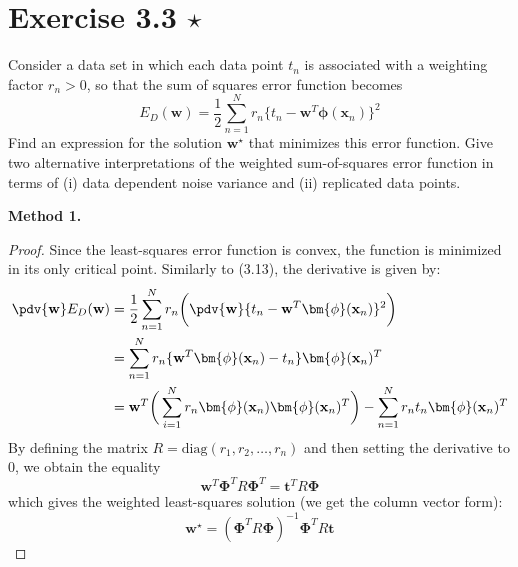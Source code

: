 \section*{Exercise 3.3 $\star$}
Consider a data set in which each data point $t_n$ is associated with a weighting
factor $r_n > 0$, so that the sum of squares error function becomes
\begin{equation}\label{eq:3.104}\tag{3.104}
    E_D(\mathbf{w}) = \frac{1}{2} \sum_{n=1}^{N} 
    r_n\{t_n - \mathbf{w}^T \bm{\phi}(\mathbf{x}_n)\}^2
\end{equation}
Find an expression for the solution $\mathbf{w}^\star$ that minimizes this error function.
Give two alternative interpretations of the weighted sum-of-squares error function
in terms of (i) data dependent noise variance and (ii) replicated data points.

\vspace{1em}

\textbf{Method 1.}

\begin{proof}
    Since the least-squares error function is convex,
    the function is minimized in its only critical 
    point. Similarly to (3.13), the derivative is given by:
    \begin{align*}
        \pdv{\mathbf{w}} E_D(\mathbf{w})
        &= \frac{1}{2} \sum_{n=1}^{N} r_n \bigg(\pdv{\mathbf{w}} 
        \{t_n - \mathbf{w}^T \bm{\phi}(\mathbf{x}_n)\}^2\bigg) \\
        &= \sum_{n=1}^N r_n \{\mathbf{w}^T \bm{\phi}(\mathbf{x}_n) - t_n\} 
        \bm{\phi}(\mathbf{x}_n)^T \\
        &= \mathbf{w}^T 
        \bigg(\sum_{i=1}^{N} r_n \bm{\phi}(\mathbf{x}_n)
        \bm{\phi}(\mathbf{x}_n)^T\bigg) -
        \sum_{n=1}^{N} r_n t_n \bm{\phi}(\mathbf{x}_n)^T
    \end{align*}
    By defining the matrix $R = \text{diag}(r_1, r_2, \ldots, r_n)$
    and then setting the derivative to 0, we obtain the equality
    \[
        \mathbf{w}^T \mathbf{\Phi}^TR\mathbf{\Phi}^T
        = \mathbf{t}^TR\mathbf{\Phi} 
    \] 
    which gives the weighted least-squares solution (we get the
    column vector form):
    \[
        \mathbf{w}^\star = (\mathbf{\Phi}^TR\mathbf{\Phi})^{-1} \mathbf{\Phi}^T R \mathbf{t} 
    \] 
\end{proof}

